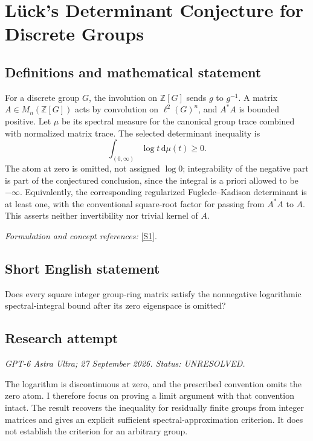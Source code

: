 \documentclass[11pt]{article}
\begin{document}
\section*{\texorpdfstring{Lück's Determinant Conjecture for Discrete Groups}{Lück's Determinant Conjecture for Discrete Groups}}\label{statement}
\subsection{Definitions and mathematical statement}
For a discrete group $G$, the involution on ${\mathbb{Z}}[G]$ sends $g$ to $g^{-1}$. A matrix $A\in M_n({\mathbb{Z}}[G])$ acts by convolution on $\ell^2(G)^n$, and $A^*A$ is bounded positive. Let $\mu$ be its spectral measure for the canonical group trace combined with normalized matrix trace. The selected determinant inequality is
\[
 \int_{(0,\infty)}\log t{\,\mathrm{d}}\mu(t)\ge0.
\]
The atom at zero is omitted, not assigned $\log0$; integrability of the negative part is part of the conjectured conclusion, since the integral is a priori allowed to be $-\infty$. Equivalently, the corresponding regularized Fuglede--Kadison determinant is at least one, with the conventional square-root factor for passing from $A^*A$ to $A$. This asserts neither invertibility nor trivial kernel of $A$.
\par\smallskip\textit{Formulation and concept references:} \href{https://arxiv.org/html/2508.15154v2}{[S1]}.

\subsection{Short English statement}
Does every square integer group-ring matrix satisfy the nonnegative logarithmic spectral-integral bound after its zero eigenspace is omitted?
\subsection{Research attempt}
\textit{GPT-6 Astra Ultra; 27 September 2026. Status: UNRESOLVED.}

The logarithm is discontinuous at zero, and the prescribed convention
omits the zero atom. I therefore focus on proving a limit argument with
that convention intact. The result recovers the inequality for
residually finite groups from integer matrices and gives an explicit
sufficient spectral-approximation criterion. It does not establish the
criterion for an arbitrary group.
\end{document}
